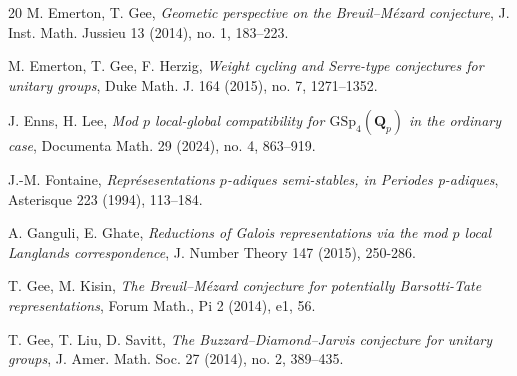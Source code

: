 \documentclass[11pt]{amsart}
\theoremstyle{definition}
\numberwithin{equation}{subsection}
\theoremstyle{plain}
\theoremstyle{plain}
\theoremstyle{plain}
\theoremstyle{plain}
\theoremstyle{plain}
\theoremstyle{plain}
\theoremstyle{plain}
\theoremstyle{plain}
\theoremstyle{plain}
\theoremstyle{plain}
\theoremstyle{plain}
\theoremstyle{plain}
\theoremstyle{definition}
\theoremstyle{definition}
\theoremstyle{definition}
\theoremstyle{remark}
\renewcommand{\(}{\textup{(}}
\renewcommand{\)}{\textup{)}}
\newcommand{\Q}{\mathbf{Q}}
\begin{document}
\begin{thebibliography}{20}
 M. Emerton, T. Gee, \emph{Geometic perspective on the Breuil--M\'ezard conjecture}, J. Inst. Math. Jussieu 13 (2014), no. 1, 183–223.

 M. Emerton, T. Gee, F. Herzig, \emph{Weight cycling and Serre-type conjectures for unitary groups}, Duke Math. J. 164 (2015), no. 7, 1271--1352.


 J. Enns, H. Lee, \emph{Mod $p$ local-global compatibility for $\mathrm{GSp}_4(\Q_p)$ in the ordinary case}, Documenta Math. 29 (2024), no. 4, 863–919.


 J.-M. Fontaine, \emph{Repr\'esesentations $p$-adiques semi-stables, in Periodes p-adiques}, Asterisque 223 (1994), 113--184.



 A. Ganguli, E. Ghate, \emph{Reductions of Galois representations via the mod $p$ local Langlands correspondence}, J. Number Theory 147 (2015), 250-286.









 T. Gee, M. Kisin, \emph{The Breuil--M\'ezard conjecture for potentially Barsotti-Tate representations}, Forum Math., Pi 2 (2014), e1, 56.


 T. Gee, T. Liu, D. Savitt, \emph{The Buzzard--Diamond--Jarvis conjecture for unitary groups}, J. Amer. Math. Soc. 27 (2014), no. 2, 389--435.



\end{thebibliography}
\end{document}
